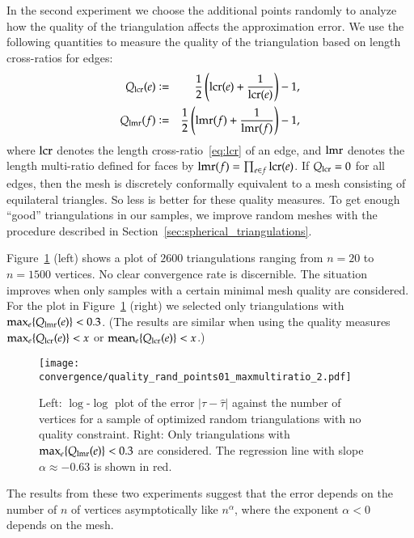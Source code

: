\documentclass[Thesis]{subfiles}
\begin{document}

In the second experiment we choose the additional points randomly to
analyze how the quality of the triangulation affects the approximation
error. We use the following quantities to measure the quality of the
triangulation based on length cross-ratios for edges:
\begin{eqnarray*}
	Q_{\operatorname{lcr}}(e) &\vcentcolon=& \frac{1}{2}\left(\operatorname{lcr}(e) + \frac{1}{\operatorname{lcr}(e)}\right) - 1\label{eq:quality_lcr},\\
	Q_{\operatorname{lmr}}(f) &\vcentcolon=& \frac{1}{2}\left(\operatorname{lmr}(f) + \frac{1}{\operatorname{lmr}(f)}\right) - 1\label{eq:quality_lmr},
\end{eqnarray*}
where $\operatorname{lcr}$ denotes the length cross-ratio~\eqref{eq:lcr} of an edge,
and $\operatorname{lmr}$ denotes the length multi-ratio defined for faces by
$\operatorname{lmr}(f)=\prod_{e \in f}\operatorname{lcr}(e)$. If $Q_{\operatorname{lcr}}=0$ for all edges, then
the mesh is discretely conformally equivalent to a mesh consisting of
equilateral triangles. So less is better for these quality
measures. To get enough ``good'' triangulations in our samples, we
improve random meshes with the procedure described in
Section~\ref{sec:spherical_triangulations}.

Figure~\ref{fig:convergence_quality} (left) shows a plot of $2600$
triangulations ranging from $n=20$ to $n=1500$ vertices. No clear
convergence rate is discernible. The situation improves when only
samples with a certain minimal mesh quality are considered.  For the
plot in Figure~\ref{fig:convergence_quality} (right) we selected only
triangulations with $\max_e \{Q_{\operatorname{lmr}}(e)\} < 0.3$. (The results
are similar when using the quality measures $\max_e \{Q_{\operatorname{lcr}}(e)\} <
x$ or $\operatorname{mean}_e \{Q_{\operatorname{lcr}}(e)\} < x$.)

\begin{figure}
\centering
\texttt{[image: convergence/quality\_rand\_points01\_maxmultiratio\_2.pdf]}
\caption{Left: $\log$-$\log$ plot of the error $|\tau - \hat\tau|$
  against the number of vertices for a sample of optimized random
  triangulations with no quality constraint. Right: Only
  triangulations with $\max_e \{Q_{\operatorname{lmr}}(e)\} < 0.3$ are
  considered. The regression line with slope $\alpha\approx -0.63$ is
  shown in red.}
\label{fig:convergence_quality}
\end{figure}

The results from these two experiments suggest that the error depends
on the number of $n$ of vertices asymptotically like $n^{\alpha}$,
where the exponent $\alpha<0$ depends on the mesh. 
\end{document}
